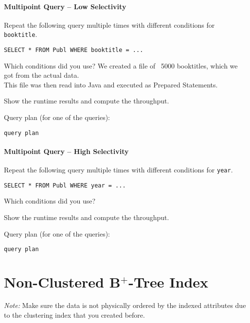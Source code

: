 \documentclass[11pt]{scrartcl}
\begin{document}
\paragraph{Multipoint Query -- Low Selectivity}

Repeat the following query multiple times with different conditions for {\tt booktitle}.

{\small
\begin{verbatim}
SELECT * FROM Publ WHERE booktitle = ...
\end{verbatim}
}

\noindent
Which conditions did you use?
We created a file of ~5000 booktitles, which we got from the actual data.\\
This file was then read into Java and executed as Prepared Statements.

\smallskip\noindent
Show the runtime results and compute the throughput.

\smallskip\noindent
Query plan (for one of the queries):
{\small
\begin{verbatim}
query plan
\end{verbatim}
}


\paragraph{Multipoint Query -- High Selectivity}

Repeat the following query multiple times with different conditions for {\tt year}.

{\small
\begin{verbatim}
SELECT * FROM Publ WHERE year = ...
\end{verbatim}
}

\noindent
Which conditions did you use?

\smallskip\noindent
Show the runtime results and compute the throughput.

\smallskip\noindent
Query plan (for one of the queries):
{\small
\begin{verbatim}
query plan
\end{verbatim}
}

\section{Non-Clustered B$^+$-Tree Index}

\noindent \emph{Note:} Make sure the data is not physically ordered by
the indexed attributes due to the clustering index that you created
before.
\end{document}
